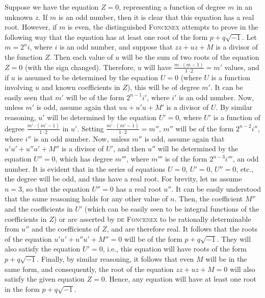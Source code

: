 \documentclass[12pt]{memoir}
\theoremstyle{plain}
\theoremstyle{remark}
\begin{document}
Suppose we have the equation \(Z = 0\), representing a function of degree \(m\) in an unknown \(z\). If \(m\) is an odd number, then it is clear that this equation has a real root. However, if \(m\) is even, the distinguished \textsc{Foncenex} attempts to prove in the following way that the equation has at least one root of the form \(p + q\surd{-1}\). Let \(m = 2^n i\), where \(i\) is an odd number, and suppose that \(zz + uz + M\) is a divisor of the function \(Z\). Then each value of \(u\) will be the sum of two roots of the equation \(Z = 0\) (with the sign changed). Therefore, \(u\) will have \(\frac{m \cdot (m-1)}{1 \cdot 2} = m'\) values, and if \(u\) is assumed to be determined by the equation \(U = 0\) (where \(U\) is a function involving \(u\) and known coefficients in \(Z\)), this will be of degree \(m'\). It can be easily seen that \(m'\) will be of the form \(2^{n-1} i'\), where \(i'\) is an odd number. Now, unless \(m'\) is odd, assume again that \(uu + u'u + M'\) is a divisor of \(U\). By similar reasoning, \(u'\) will be determined by the equation \(U' = 0\), where \(U'\) is a function of degree \(\frac{m' \cdot (m'-1)}{1 \cdot 2}\) in \(u'\). Setting \(\frac{m' \cdot (m'-1)}{1 \cdot 2} = m''\), \(m''\) will be of the form \(2^{n-2}i''\), where \(i''\) is an odd number. Now, unless \(m''\) is odd, assume again that \(u'u'+u''u'+M''\) is a divisor of \(U'\), and then \(u''\) will be determined by the equation \(U'' = 0\), which has degree \(m'''\), where \(m'''\) is of the form \(2^{n-3}i'''\), an odd number. It is evident that in the series of equations \(U=0\), \(U'=0\), \(U''=0\), etc., the degree will be odd, and thus have a real root. For brevity, let us assume \(n = 3\), so that the equation \(U''=0\) has a real root \(u''\). It can be easily understood that the same reasoning holds for any other value of \(n\). Then, the coefficient \(M''\) and the coefficients in \(U'\) (which can be easily seen to be integral functions of the coefficients in \(Z\)) or are asserted by \textsc{de Foncenex} to be rationally determinable from \(u''\) and the coefficients of \(Z\), and are therefore real. It follows that the roots of the equation \(u'u'+u''u'+M''=0\) will be of the form \(p + q\surd{-1}\). They will also satisfy the equation \(U' = 0\), i.e., this equation will have roots of the form \(p + q\surd{-1}\). Finally, by similar reasoning, it follows that even \(M\) will be in the same form, and consequently, the root of the equation \(zz+uz+M=0\) will also satisfy the given equation \(Z=0\). Hence, any equation will have at least one root in the form \(p+q\surd{-1}\).
\end{document}
